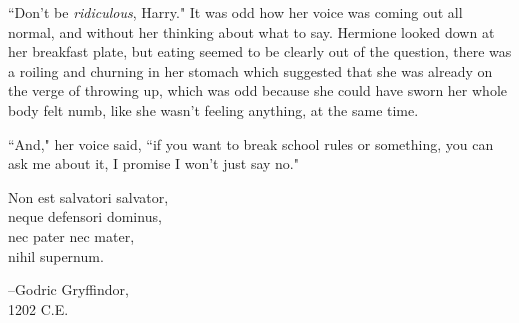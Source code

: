 ``Don't be \emph{ridiculous}, Harry." It was odd how her voice was coming out all normal, and without her thinking about what to say. Hermione looked down at her breakfast plate, but eating seemed to be clearly out of the question, there was a roiling and churning in her stomach which suggested that she was already on the verge of throwing up, which was odd because she could have sworn her whole body felt numb, like she wasn't feeling anything, at the same time.

``And," her voice said, ``if you want to break school rules or something, you can ask me about it, I promise I won't just say no."

\later

\begin{center}
Non est salvatori salvator,\\
neque defensori dominus,\\
nec pater nec mater,\\
nihil supernum.

\---Godric Gryffindor,\\
1202 C.E.
\end{center}

